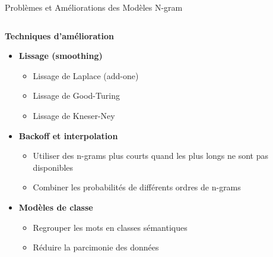 \documentclass[aspectratio=169,11pt]{beamer}
\begin{document}
\begin{frame}{Problèmes et Améliorations des Modèles N-gram}
\begin{columns}
\begin{column}{0.5\textwidth}
            \textbf{Techniques d'amélioration}
            \begin{itemize}
                \item \textbf{Lissage (smoothing)}
                \begin{itemize}
                    \item Lissage de Laplace (add-one)
                    \item Lissage de Good-Turing
                    \item Lissage de Kneser-Ney
                \end{itemize}
                \vspace{0.2cm}
                \item \textbf{Backoff et interpolation}
                \begin{itemize}
                    \item Utiliser des n-grams plus courts quand les plus longs ne sont pas disponibles
                    \item Combiner les probabilités de différents ordres de n-grams
                \end{itemize}
                \vspace{0.2cm}
                \item \textbf{Modèles de classe}
                \begin{itemize}
                    \item Regrouper les mots en classes sémantiques
                    \item Réduire la parcimonie des données
                \end{itemize}
            \end{itemize}
        \end{column}
    \end{columns}
\end{frame}
\end{document}
